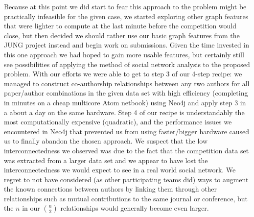 Because at this point we did start to fear this approach to the problem might be practically infeasible for the given case, we started exploring other graph features that were lighter to compute at the last minute before the competition would close, but then decided we should rather use our basic graph features from the JUNG project instead and begin work on submissions.
Given the time invested in this one approach we had hoped to gain more usable features, but certainly still see possibilities of applying the method of social network analysis to the proposed problem.
With our efforts we were able to get to step 3 of our 4-step recipe: we managed to construct co-authorship relationships between any two authors for all paper/author combinations in the given data set with high efficiency (completing in minutes on a cheap multicore Atom netbook) using Neo4j and apply step 3 in a about a day on the same hardware.
Step 4 of our recipe is understandably the most computationally expensive (quadratic), and the performance issues we encountered in Neo4j that prevented us from using faster/bigger hardware caused us to finally abandon the chosen approach.
We suspect that the low interconnectedness we observed was due to the fact that the competition data set was extracted from a larger data set and we appear to have lost the interconnectedness we would expect to see in a real world social network.
We regret to not have considered (as other participating teams did) ways to augment the known connections between authors by linking them through other relationships such as mutual contributions to the same journal or conference, but the $n$ in our $n \choose 2$ relationships would generally become even larger.

